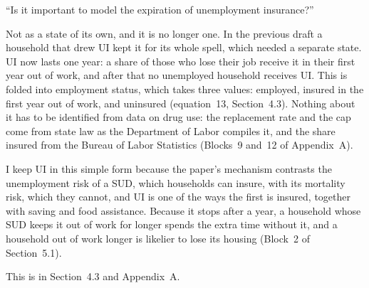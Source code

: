 \documentclass[11pt]{article}
\begin{document}
\begin{referee}
``Is it important to model the expiration of unemployment insurance?''
\end{referee}
\begin{response}
\concede Not as a state of its own, and it is no longer one. In the previous draft
a household that drew UI kept it for its whole spell, which needed a separate
state. UI now lasts one year: a share of those who lose their job receive it in
their first year out of work, and after that no unemployed household receives UI.
This is folded into employment status, which takes three values: employed, insured
in the first year out of work, and uninsured (equation~13, Section~4.3). Nothing
about it has to be identified from data on drug use: the replacement rate and the
cap come from state law as the Department of Labor compiles it, and the share
insured from the Bureau of Labor Statistics (Blocks~9 and~12 of Appendix~A).

I keep UI in this simple form because the paper's mechanism contrasts the
unemployment risk of a SUD, which households can insure, with its mortality risk,
which they cannot, and UI is one of the ways the first is insured, together with
saving and food assistance. Because it stops after a year, a household whose SUD
keeps it out of work for longer spends the extra time without it, and a household
out of work longer is likelier to lose its housing (Block~2 of Section~5.1).

This is in Section~4.3 and Appendix~A.
\end{response}
\end{document}
